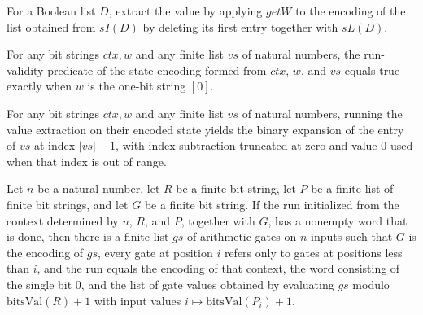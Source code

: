 \begin{definition}
\label{Randomized.PIT.runVal}
\leanok
{}
For a Boolean list $D$, extract the value by applying $getW$ to the encoding of the list
obtained from $sI(D)$ by deleting its first entry together with $sL(D)$.
\end{definition}

\begin{theorem}
\label{Randomized.PIT.runOk_encState}
\leanok
{}
For any bit strings $ctx,w$ and any finite list $vs$ of natural numbers, the
run-validity predicate of the state encoding formed from $ctx$, $w$, and $vs$ equals
true exactly when $w$ is the one-bit string $[0]$.
\end{theorem}

\begin{theorem}
\label{Randomized.PIT.runVal_encState}
\leanok
{}
For any bit strings $ctx,w$ and any finite list $vs$ of natural numbers, running the
value extraction on their encoded state yields the binary expansion of the entry of $vs$
at index $|vs|-1$, with index subtraction truncated at zero and value $0$ used when that
index is out of range.
\end{theorem}

\begin{theorem}
\label{Randomized.PIT.exists_of_runOk}
\leanok
{}
Let $n$ be a natural number, let $R$ be a finite bit string, let $P$ be a finite list of
finite bit strings, and let $G$ be a finite bit string. If the run initialized from the
context determined by $n$, $R$, and $P$, together with $G$, has a nonempty word that is
done, then there is a finite list $gs$ of arithmetic gates on $n$ inputs such that $G$
is the encoding of $gs$, every gate at position $i$ refers only to gates at positions
less than $i$, and the run equals the encoding of that context, the word consisting of
the single bit $0$, and the list of gate values obtained by evaluating $gs$ modulo
$\mathrm{bitsVal}(R)+1$ with input values $i \mapsto \mathrm{bitsVal}(P_i)+1$.
\end{theorem}

